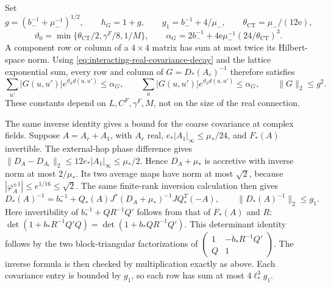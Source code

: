 \documentclass[11pt,letterpaper,reqno]{amsart}
\begin{document}
Set
\[
 g=(b_-^{-1}+\mu_-^{-1})^{1/2},\qquad
 h_G=1+g,\qquad g_1=b_-^{-1}+4/\mu_-,
 \qquad \theta_{\mathrm{CT}}=\mu_-/(12\mathrm e),
\]
\[
 \vartheta_0=\min\{\theta_{\mathrm{CT}}/2,\gamma^F/8,1/M\},
 \qquad
 \alpha_G=2b_-^{-1}
        +4\mathrm e\mu_-^{-1}(24/\theta_{\mathrm{CT}})^3.
\]
A component row or column of a $4\times4$ matrix
has sum at most twice its Hilbert-space norm.
Using \eqref{eq:interacting-real-covariance-decay}
and the lattice exponential sum, every row and
column of $G=D_*(A_r)^{-1}$ therefore satisfies
\begin{equation}\label{eq:interacting-Gaussian-covariance}
 \sum_{u'}|G(u,u')|e^{\vartheta_0d(u,u')}
       \le\alpha_G,\qquad
 \sum_u|G(u,u')|e^{\vartheta_0d(u,u')}
       \le\alpha_G,\qquad \|G\|_2\le g^2.
\end{equation}
These constants depend on $L,C^F,\gamma^F,M$,
not on the size of the real connection.

The same inverse identity gives a bound for the
coarse covariance at complex fields. Suppose
$A=A_r+A_1$, with $A_r$ real,
$e_*|A_1|_\infty\le\mu_*/24$, and $F_*(A)$
invertible. The external-hop phase difference
gives $\|D_A-D_{A_r}\|_2\le12e_*|A_1|_\infty
\le\mu_*/2$. Hence $D_A+\mu_*$ is accretive
with inverse norm at most $2/\mu_*$. Its two
average maps have norm at most $\sqrt2$,
because $|\varphi_A^{\pm1}|\le e^{1/16}\le\sqrt2$.
The same finite-rank inversion calculation
then gives
\begin{equation}\label{eq:interacting-complex-covariance}
 D_*(A)^{-1}=b_*^{-1}+
 Q_*(A)J^*(D_A+\mu_*)^{-1}JQ_*^T(-A),
 \qquad
 \|D_*(A)^{-1}\|_2\le g_1.
\end{equation}
Here invertibility of $b_*^{-1}+QR^{-1}Q'$
follows from that of $F_*(A)$ and $R$:
$\det(1+b_*R^{-1}Q'Q)=\det(1+b_*QR^{-1}Q')$.
This determinant identity follows by the two
block-triangular factorizations of
$\left(\begin{smallmatrix}1&-b_*R^{-1}Q'\\Q&1\end{smallmatrix}\right)$.
The inverse formula is then checked by
multiplication exactly as above.
Each covariance entry is bounded by $g_1$,
so each row has sum at most $4\ell_*^3g_1$.


\printbibliography
\end{document}
